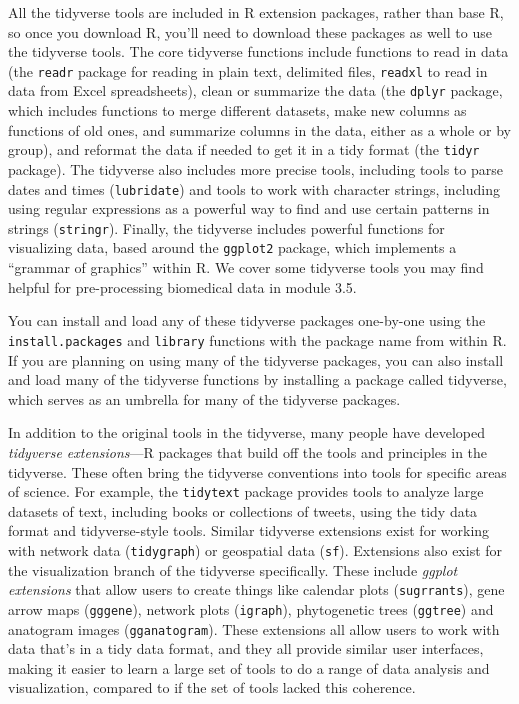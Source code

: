 \documentclass[]{tufte-book}
\begin{document}
All the tidyverse tools are included in R extension packages, rather than base
R, so once you download R, you'll need to download these packages as well to use
the tidyverse tools. The core tidyverse functions include functions to read in
data (the \texttt{readr} package for reading in plain text, delimited files, \texttt{readxl}
to read in data from Excel spreadsheets), clean or summarize the data (the
\texttt{dplyr} package, which includes functions to merge different datasets, make
new columns as functions of old ones, and summarize columns in the data, either
as a whole or by group), and reformat the data if needed to get it in a tidy
format (the \texttt{tidyr} package). The tidyverse also includes more precise tools,
including tools to parse dates and times (\texttt{lubridate}) and tools to work with
character strings, including using regular expressions as a powerful way to find
and use certain patterns in strings (\texttt{stringr}). Finally, the tidyverse
includes powerful functions for visualizing data, based around the \texttt{ggplot2}
package, which implements a ``grammar of graphics'' within R. We cover some
tidyverse tools you may find helpful for pre-processing biomedical data in
module 3.5.

You can install and load any of these tidyverse packages one-by-one using the
\texttt{install.packages} and \texttt{library} functions with the package name from within R.
If you are planning on using many of the tidyverse packages, you can also
install and load many of the tidyverse functions by installing a package called
tidyverse, which serves as an umbrella for many of the tidyverse packages.

In addition to the original tools in the tidyverse, many people have developed
\emph{tidyverse extensions}---R packages that build off the tools and principles in
the tidyverse. These often bring the tidyverse conventions into tools for
specific areas of science. For example, the \texttt{tidytext} package provides tools to
analyze large datasets of text, including books or collections of tweets, using
the tidy data format and tidyverse-style tools. Similar tidyverse extensions
exist for working with network data (\texttt{tidygraph}) or geospatial data (\texttt{sf}).
Extensions also exist for the visualization branch of the tidyverse
specifically. These include \emph{ggplot extensions} that allow users to create
things like calendar plots (\texttt{sugrrants}), gene arrow maps (\texttt{gggene}), network
plots (\texttt{igraph}), phytogenetic trees (\texttt{ggtree}) and anatogram images
(\texttt{gganatogram}). These extensions all allow users to work with data that's in a
tidy data format, and they all provide similar user interfaces, making it
easier to learn a large set of tools to do a range of data analysis and
visualization, compared to if the set of tools lacked this coherence.
\end{document}
